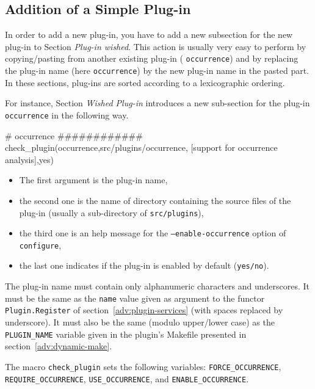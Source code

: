 \subsection{Addition of a Simple Plug-in}\label{conf:add}

In order to add a new plug-in, you have to add a new subsection for the new
plug-in to Section \emph{Plug-in wished}. This action is usually very easy to
perform by copying/pasting from another existing plug-in (\eg
\texttt{occurrence})
and by replacing the plug-in name (here \texttt{occurrence}) by the new plug-in
name in the pasted part. In these sections, plug-ins are sorted according to a
lexicographic ordering.

For instance, Section \emph{Wished Plug-in} introduces a new sub-section for
the plug-in \texttt{occurrence} in the following way.
\begin{configurecode}
# occurrence
############
check_plugin(occurrence,src/plugins/occurrence,
             [support for occurrence analysis],yes)
\end{configurecode}
\begin{itemize}
\item The first argument is the plug-in name,
\item the second one is the name of directory containing the source files 
  of the plug-in (usually a sub-directory of \texttt{src/plugins}), 
\item the third one is an help message for the \texttt{--enable-occurrence} 
  option of \texttt{configure},
\item the last one indicates if the plug-in is enabled by default
  (\texttt{yes/no}).
\end{itemize}

\begin{important}
The plug-in name must contain only alphanumeric characters and
underscores. It must be the same as the \texttt{name} value given as
argument to the functor \texttt{Plugin.Register} of
section~\ref{adv:plugin-services} (with spaces replaced by underscore). It must
also be the same (modulo upper/lower case) as the \texttt{PLUGIN\_NAME} variable
given in the plugin's Makefile presented in section~\ref{adv:dynamic-make}.
\end{important}

\begin{important}
  The macro \texttt{check\_plugin} sets
  the following variables:
  \texttt{FORCE\_OCCURRENCE},
  \texttt{REQUIRE\_OCCURRENCE},
  \texttt{USE\_OCCURRENCE}, and
  \texttt{ENABLE\_OCCURRENCE}.
\end{important}

